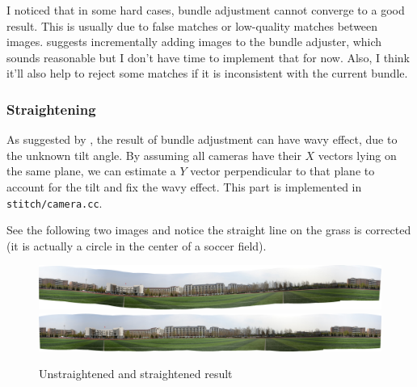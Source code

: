 I noticed that in some hard cases, bundle adjustment cannot converge to a good result.
This is usually due to false matches or low-quality matches between images.
\cite{panoramic-sift} suggests incrementally adding images to the bundle adjuster,
which sounds reasonable but I don't have time to implement that for now.
Also, I think it'll also help to reject some matches if it is inconsistent with
the current bundle.

\subsubsection{Straightening}
As suggested by \cite{panoramic-sift}, the result of bundle adjustment
can have wavy effect, due to the unknown tilt angle.
By assuming all cameras have their $X$ vectors lying on the same plane,
we can estimate a $Y$ vector perpendicular to that plane
to account for the tilt and fix the wavy effect. This part
is implemented in \verb|stitch/camera.cc|.

See the following two images and notice the straight line on the grass
is corrected (it is actually a circle in the center of a soccer field).
\begin{figure}[H]
  \centering
  \includegraphics[width=\textwidth]{res/wavy.jpg}
  \includegraphics[width=\textwidth]{res/unwavy.jpg}
  \caption{Unstraightened and straightened result\label{fig:general-straighten}}
\end{figure}

